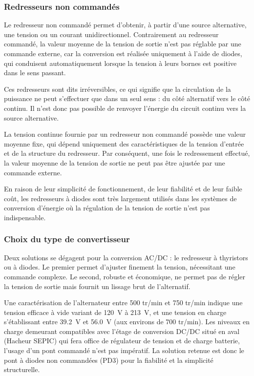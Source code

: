         \subsubsection*{Redresseurs non commandés}
        Le redresseur non commandé permet d'obtenir, à partir d'une source alternative, une tension ou un courant unidirectionnel. Contrairement au redresseur commandé, la valeur moyenne de la tension de sortie n'est pas réglable par une commande externe, car la conversion est réalisée uniquement à l'aide de diodes, qui conduisent automatiquement lorsque la tension à leurs bornes est positive dans le sens passant.

        Ces redresseurs sont dits irréversibles, ce qui signifie que la circulation de la puissance ne peut s'effectuer que dans un seul sens : du côté alternatif vers le côté continu. Il n'est donc pas possible de renvoyer l'énergie du circuit continu vers la source alternative.

        La tension continue fournie par un redresseur non commandé possède une valeur moyenne fixe, qui dépend uniquement des caractéristiques de la tension d'entrée et de la structure du redresseur. Par conséquent, une fois le redressement effectué, la valeur moyenne de la tension de sortie ne peut pas être ajustée par une commande externe.

        En raison de leur simplicité de fonctionnement, de leur fiabilité et de leur faible coût, les redresseurs à diodes sont très largement utilisés dans les systèmes de conversion d'énergie où la régulation de la tension de sortie n'est pas indispensable.

        \subsubsection{Choix du type de convertisseur}
        \label{sec:choix_convertisseur}
        Deux solutions se dégagent pour la conversion AC/DC : le redresseur à thyristors ou à diodes. Le premier permet d'ajuster finement la tension, nécessitant une commande complexe. Le second, robuste et économique, ne permet pas de régler la tension de sortie mais fournit un lissage brut de l'alternatif.

        Une caractérisation de l'alternateur entre 500 tr/min et 750 tr/min indique une tension efficace à vide variant de \SI{120}{\volt} à \SI{213}{\volt}, et une tension en charge s'établissant entre \SI{39.2}{\volt} et \SI{56.0}{\volt} (aux environs de 700 tr/min). Les niveaux en charge demeurant compatibles avec l'étage de conversion DC/DC situé en aval (Hacheur SEPIC) qui fera office de régulateur de tension et de charge batterie, l'usage d'un pont commandé n'est pas impératif. La solution retenue est donc le pont à diodes non commandées (PD3) pour la fiabilité et la simplicité structurelle.

